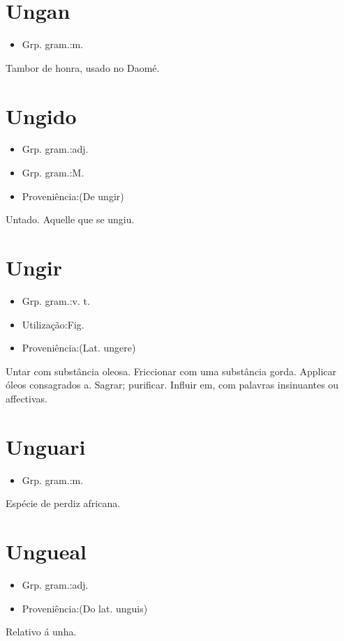 \documentclass{article}
\begin{document}
\section{Ungan}
\begin{itemize}
\item {Grp. gram.:m.}
\end{itemize}
Tambor de honra, usado no Daomé.
\section{Ungido}
\begin{itemize}
\item {Grp. gram.:adj.}
\end{itemize}
\begin{itemize}
\item {Grp. gram.:M.}
\end{itemize}
\begin{itemize}
\item {Proveniência:(De \textunderscore ungir\textunderscore )}
\end{itemize}
Untado.
Aquelle que se ungiu.
\section{Ungir}
\begin{itemize}
\item {Grp. gram.:v. t.}
\end{itemize}
\begin{itemize}
\item {Utilização:Fig.}
\end{itemize}
\begin{itemize}
\item {Proveniência:(Lat. \textunderscore ungere\textunderscore )}
\end{itemize}
Untar com substância oleosa.
Friccionar com uma substância gorda.
Applicar óleos consagrados a.
Sagrar; purificar.
Influir em, com palavras insinuantes ou affectivas.
\section{Unguari}
\begin{itemize}
\item {Grp. gram.:m.}
\end{itemize}
Espécie de perdiz africana.
\section{Ungueal}
\begin{itemize}
\item {Grp. gram.:adj.}
\end{itemize}
\begin{itemize}
\item {Proveniência:(Do lat. \textunderscore unguis\textunderscore )}
\end{itemize}
Relativo á unha.
\end{document}
